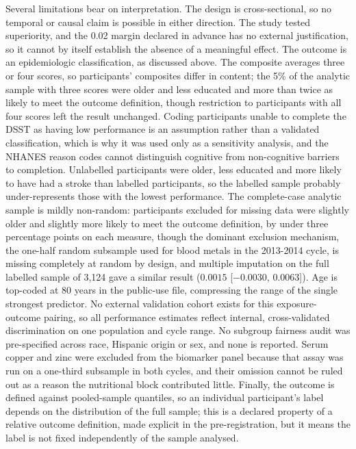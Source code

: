 \documentclass[12pt]{article}
\begin{document}
Several limitations bear on interpretation. The design is cross-sectional, so no temporal or causal claim is possible in either direction. The study tested superiority, and the 0.02 margin declared in advance has no external justification, so it cannot by itself establish the absence of a meaningful effect. The outcome is an epidemiologic classification, as discussed above. The composite averages three or four scores, so participants' composites differ in content; the 5\% of the analytic sample with three scores were older and less educated and more than twice as likely to meet the outcome definition, though restriction to participants with all four scores left the result unchanged. Coding participants unable to complete the DSST as having low performance is an assumption rather than a validated classification, which is why it was used only as a sensitivity analysis, and the NHANES reason codes cannot distinguish cognitive from non-cognitive barriers to completion. Unlabelled participants were older, less educated and more likely to have had a stroke than labelled participants, so the labelled sample probably under-represents those with the lowest performance. The complete-case analytic sample is mildly non-random: participants excluded for missing data were slightly older and slightly more likely to meet the outcome definition, by under three percentage points on each measure, though the dominant exclusion mechanism, the one-half random subsample used for blood metals in the 2013-2014 cycle, is missing completely at random by design, and multiple imputation on the full labelled sample of 3,124 gave a similar result ($0.0015$ [$-0.0030$, $0.0063$]). Age is top-coded at 80 years in the public-use file, compressing the range of the single strongest predictor. No external validation cohort exists for this exposure-outcome pairing, so all performance estimates reflect internal, cross-validated discrimination on one population and cycle range. No subgroup fairness audit was pre-specified across race, Hispanic origin or sex, and none is reported. Serum copper and zinc were excluded from the biomarker panel because that assay was run on a one-third subsample in both cycles, and their omission cannot be ruled out as a reason the nutritional block contributed little. Finally, the outcome is defined against pooled-sample quantiles, so an individual participant's label depends on the distribution of the full sample; this is a declared property of a relative outcome definition, made explicit in the pre-registration, but it means the label is not fixed independently of the sample analysed.
\end{document}
